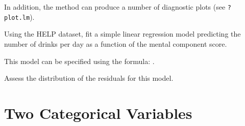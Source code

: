 In addition, the  method can produce a number of diagnostic plots
(see \texttt{?plot.lm}).

\begin{multicols}{2}
\begin{center}
\begin{knitrout}
\end{knitrout}

\begin{knitrout}
\end{knitrout}

\end{center}
\end{multicols}

\begin{problem}
Using the HELP dataset, fit a simple linear regression model 
predicting the number of drinks per day as a function of the mental
component score.  

This model can be specified using the formula:
.  

Assess the distribution of the residuals for this model.
\end{problem}


\section{Two Categorical Variables}


